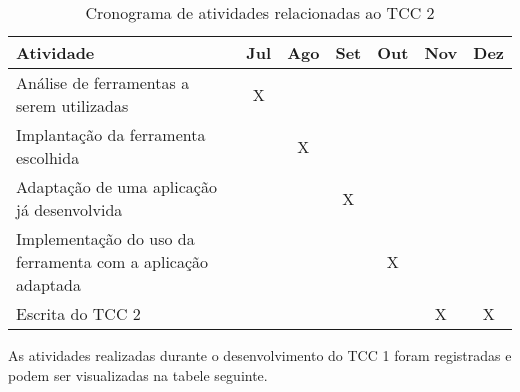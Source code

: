 \begin{table}[!h]
\centering
\caption{Cronograma de atividades relacionadas ao TCC 2}
\label{cronograma_tcc2}
\begin{tabular}{|p{9cm}|c|c|c|c|c|c|}
\hline
Atividade                                                   & \multicolumn{1}{l|}{Jul} & \multicolumn{1}{l|}{Ago} & \multicolumn{1}{l|}{Set} & \multicolumn{1}{l|}{Out} & \multicolumn{1}{l|}{Nov} & \multicolumn{1}{l|}{Dez} \\ \hline
Análise de ferramentas a serem utilizadas                   & X                           &                             &                              &                            &                             &                              \\ \hline
Implantação da ferramenta escolhida                         &                             & X                            &                              &                            &                             &                              \\ \hline
Adaptação de uma aplicação já desenvolvida                  &                             &                               & X                            &                            &                             &                              \\ \hline
Implementação do uso da ferramenta com a aplicação adaptada &                             &                         &                              & X                          &                             &                              \\ \hline
Escrita do TCC 2                                            &                             &                             &                              &                            & X                           & X          \\ \hline
\end{tabular}
\end{table}


As atividades realizadas durante o desenvolvimento do TCC 1 foram registradas e podem ser visualizadas na tabele seguinte.


